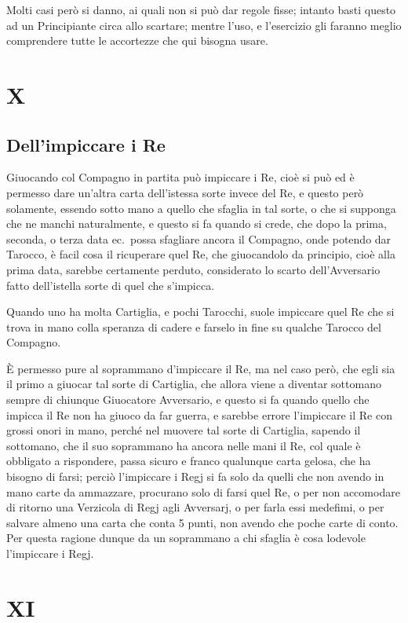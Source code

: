 \documentclass[11pt,a6paper]{article}
\begin{document}
Molti casi però si danno, ai quali non si può dar regole fisse; intanto basti questo ad un Principiante circa allo scartare; mentre l'uso, e l'esercizio gli faranno meglio comprendere tutte le accortezze che qui bisogna usare.


\section{X}
\subsection*{Dell'impiccare i Re}

Giuocando col Compagno in partita può impiccare i Re, cioè
si può ed è permesso dare un'altra carta dell'istessa sorte invece del Re, e questo però solamente, essendo sotto mano a quello che sfaglia in tal sorte, o che si supponga che ne manchi naturalmente, e questo si fa quando si crede, che dopo la prima, seconda, o terza data ec.\ possa sfagliare ancora il Compagno, onde potendo dar Tarocco, è facil cosa il ricuperare quel Re, che giuocandolo da principio, cioè alla prima data, sarebbe certamente perduto, considerato lo scarto dell'Avversario fatto dell'istella sorte di quel che s'impicca.

Quando uno ha molta Cartiglia, e pochi Tarocchi, suole impiccare quel Re che
si trova in mano colla speranza di cadere e farselo in fine su qualche Tarocco del Compagno.

È permesso pure al soprammano d'impiccare il Re, ma nel caso però, che egli sia il primo a giuocar tal sorte di Cartiglia, che allora viene a diventar sottomano sempre di chiunque Giuocatore Avversario, e questo si fa quando quello che impicca il Re non ha giuoco da far guerra, e sarebbe errore l'impiccare il Re con grossi onori in mano, perché nel muovere tal sorte di Cartiglia, sapendo il sottomano, che il suo soprammano ha ancora nelle mani il Re, col quale è obbligato a rispondere, passa sicuro e franco qualunque carta gelosa, che ha bisogno di farsi; perciò l'impiccare i Regj si fa solo da quelli che non avendo in mano carte da ammazzare, procurano solo di farsi quel Re, o per non accomodare di ritorno una Verzicola di Regj agli Avversarj, o per farla essi medefimi, o per salvare almeno una carta che conta 5 punti, non avendo che poche carte di conto. Per questa ragione dunque da un soprammano a chi sfaglia è cosa lodevole l'impiccare i Regj.

\section{XI}
\end{document}
